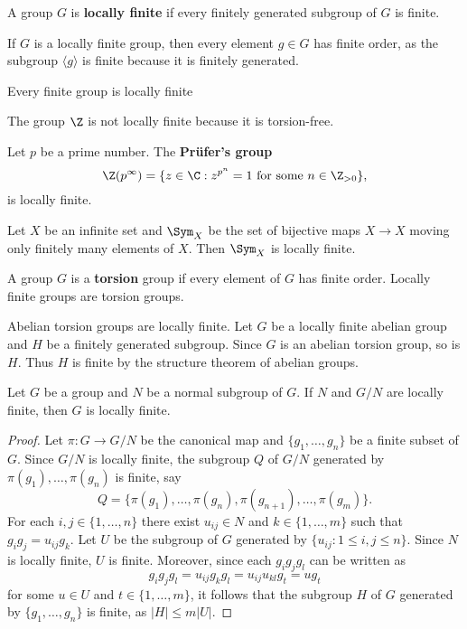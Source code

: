 \begin{definition}
	A group $G$ is \textbf{locally finite} if every finitely generated 
	subgroup of $G$ is finite. 
\end{definition}

If $G$ is a locally finite group, then every element $g\in G$ has finite order, as
the subgroup $\langle g\rangle$ is finite because it is finitely generated.

\begin{example}
    Every finite group is locally finite
\end{example}

\begin{example}
    The group $\Z$ is not locally finite because it is torsion-free.
\end{example}

\begin{example}
	Let $p$ be a prime number. 
	The \textbf{Pr\"ufer's group}  
	\[
		\Z(p^{\infty})=\{z\in\C:z^{p^n}=1\text{ for some $n\in\Z_{>0}$}\}, 
	\]
	is locally finite. 
\end{example}

\begin{example}
	Let $X$ be an infinite set and $\Sym_X$ be the set of bijective maps $X\to
	X$ moving only finitely many elements of $X$. Then 
	$\Sym_X$ is locally finite.
\end{example}

A group $G$ is a \textbf{torsion} group if every element of $G$
has finite order. Locally finite groups are torsion groups. 

\begin{example}
    Abelian torsion groups are locally finite. Let $G$ be a locally finite abelian group 
    and $H$ be a finitely generated subgroup. Since $G$ is an abelian torsion group, so is $H$. Thus
    $H$ is finite by the structure theorem of abelian groups. 
\end{example}

\begin{proposition}
\label{pro:exact_LI}
	Let $G$ be a group and $N$ be a normal subgroup of $G$. If $N$ and $G/N$
	are locally finite, then $G$ is locally finite.
\end{proposition}

\begin{proof}
	Let $\pi\colon G\to G/N$ be the canonical map and $\{g_1,\dots,g_n\}$ be a finite subset of $G$. 
	Since $G/N$ is locally finite, the subgroup $Q$ of $G/N$ generated by 
	$\pi(g_1),\dots,\pi(g_n)$ is finite, say
	\[
		Q=\{\pi(g_1),\dots,\pi(g_n),\pi(g_{n+1}),\dots,\pi(g_m)\}.
	\]
	For each $i,j\in\{1,\dots,n\}$ there exist $u_{ij}\in N$ and 
	$k\in\{1,\dots,m\}$ such that $g_ig_j=u_{ij}g_k$. Let $U$ be the subgroup of $G$
	generated by $\{u_{ij}:1\leq i,j\leq n\}$. Since $N$ is locally finite, $U$ is finite. Moreover, since 
	each $g_ig_jg_l$ can be written as 
	\[
		g_ig_jg_l=u_{ij}g_kg_l=u_{ij}u_{kl}g_t=ug_t
	\]
	for some $u\in U$ and $t\in\{1,\dots,m\}$, it follows that the subgroup 
	$H$ of $G$ generated by $\{g_1,\dots,g_n\}$ is finite, as 
	$|H|\leq m|U|$. 
\end{proof}

